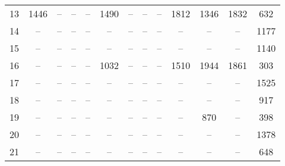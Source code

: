 \begin{table}[H]
{\begin{tabular}{c|cccccccccccc}
            13          & 1446          & --            & --            & --                & 1490          & --            & --                & --                & 1812              & 1346                  & 1832                  & 632                   \\ 
            14          & --            & --            & --            & --                & --            & --            & --                & --                & --                & --                    & --                    & 1177                  \\ 
            15          & --            & --            & --            & --                & --            & --            & --                & --                & --                & --                    & --                    & 1140                  \\ 
            16          & --            & --            & --            & --                & 1032          & --            & --                & --                & 1510              & 1944                  & 1861                  & 303                   \\ 
            17          & --            & --            & --            & --                & --            & --            & --                & --                & --                & --                    & --                    & 1525                  \\ 
            18          & --            & --            & --            & --                & --            & --            & --                & --                & --                & --                    & --                    & 917                   \\ 
            19          & --            & --            & --            & --                & --            & --            & --                & --                & --                & 870                   & --                    & 398                   \\ 
            20          & --            & --            & --            & --                & --            & --            & --                & --                & --                & --                    & --                    & 1378                  \\ 
            21          & --            & --            & --            & --                & --            & --            & --                & --                & --                & --                    & --                    & 648                   \\ 
            \bottomrule
        \end{tabular}
    }
\end{table}